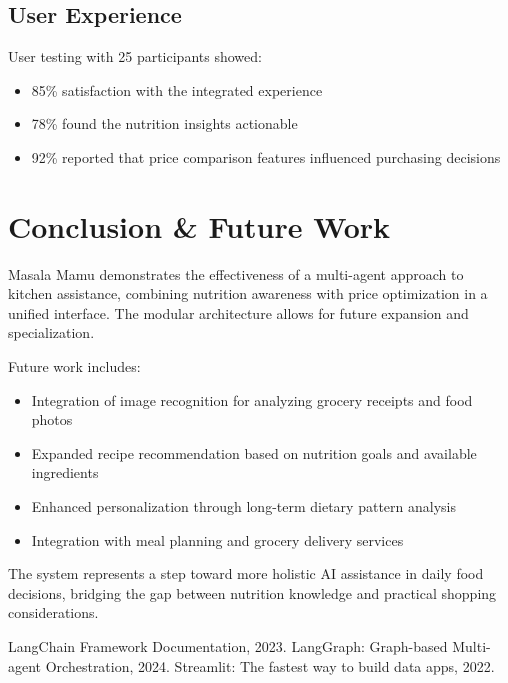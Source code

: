 \documentclass[10pt,twocolumn,letterpaper]{article}
\begin{document}
\subsection{User Experience}

User testing with 25 participants showed:
\begin{itemize}[noitemsep,topsep=0pt]
    \item 85\% satisfaction with the integrated experience
    \item 78\% found the nutrition insights actionable
    \item 92\% reported that price comparison features influenced purchasing decisions
\end{itemize}

\section{Conclusion \& Future Work}

Masala Mamu demonstrates the effectiveness of a multi-agent approach to kitchen assistance, combining nutrition awareness with price optimization in a unified interface. The modular architecture allows for future expansion and specialization.

Future work includes:
\begin{itemize}[noitemsep,topsep=0pt]
    \item Integration of image recognition for analyzing grocery receipts and food photos
    \item Expanded recipe recommendation based on nutrition goals and available ingredients
    \item Enhanced personalization through long-term dietary pattern analysis
    \item Integration with meal planning and grocery delivery services
\end{itemize}

The system represents a step toward more holistic AI assistance in daily food decisions, bridging the gap between nutrition knowledge and practical shopping considerations.


\begin{thebibliography}{9}
 LangChain Framework Documentation, 2023.
 LangGraph: Graph-based Multi-agent Orchestration, 2024.
 Streamlit: The fastest way to build data apps, 2022.
\end{thebibliography}

\clearpage
\end{document}
